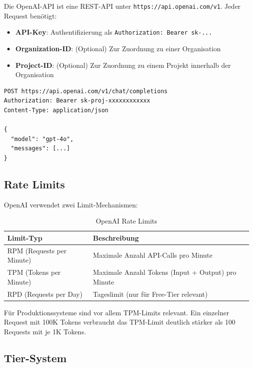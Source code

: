 Die OpenAI-API ist eine REST-API unter \texttt{https://api.openai.com/v1}. Jeder Request benötigt:

\begin{itemize}[leftmargin=*]
    \item \textbf{API-Key}: Authentifizierung als \texttt{Authorization: Bearer sk-...}
    \item \textbf{Organization-ID}: (Optional) Zur Zuordnung zu einer Organisation
    \item \textbf{Project-ID}: (Optional) Zur Zuordnung zu einem Projekt innerhalb der Organisation
\end{itemize}

\begin{verbatim}
POST https://api.openai.com/v1/chat/completions
Authorization: Bearer sk-proj-xxxxxxxxxxxx
Content-Type: application/json

{
  "model": "gpt-4o",
  "messages": [...]
}
\end{verbatim}

\subsection{Rate Limits}

OpenAI verwendet zwei Limit-Mechanismen:

\begin{table}[H]
\centering
\begin{tabularx}{\linewidth}{lX}
\toprule
\textbf{Limit-Typ} & \textbf{Beschreibung} \\
\midrule
RPM (Requests per Minute) & Maximale Anzahl API-Calls pro Minute \\
TPM (Tokens per Minute) & Maximale Anzahl Tokens (Input + Output) pro Minute \\
RPD (Requests per Day) & Tageslimit (nur für Free-Tier relevant) \\
\bottomrule
\end{tabularx}
\caption{OpenAI Rate Limits}
\label{tab:rate-limits}
\end{table}

Für Produktionssysteme sind vor allem TPM-Limits relevant. Ein einzelner Request mit 100K Tokens verbraucht das TPM-Limit deutlich stärker als 100 Requests mit je 1K Tokens.

\subsection{Tier-System}

